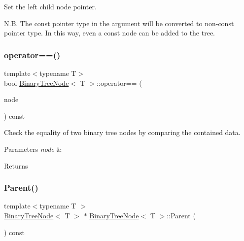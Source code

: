 Set the left child node pointer.

N.\+B. The const pointer type in the argument will be converted to non-\/const pointer type. In this way, even a const node can be added to the tree. \mbox{\label{classBinaryTreeNode_a0a362a295603c8dfffb45663e3c89507}} 
\subsubsection{\texorpdfstring{operator==()}{operator==()}}
{\footnotesize\ttfamily template$<$typename T$>$ \\
bool \hyperlink{classBinaryTreeNode}{Binary\+Tree\+Node}$<$ T $>$\+::operator== (\begin{DoxyParamCaption}\item[{const \hyperlink{classBinaryTreeNode}{Binary\+Tree\+Node}$<$ T $>$ \&}]{node }\end{DoxyParamCaption}) const}

Check the equality of two binary tree nodes by comparing the contained data. 
\begin{DoxyParams}{Parameters}
{\em node} & \\
\hline
\end{DoxyParams}
\begin{DoxyReturn}{Returns}

\end{DoxyReturn}
\mbox{\label{classBinaryTreeNode_a2eea9d71ae776d02b23bb9f3869f0f6d}} 
\subsubsection{\texorpdfstring{Parent()}{Parent()}\hspace{0.1cm}{\footnotesize\ttfamily [1/2]}}
{\footnotesize\ttfamily template$<$typename T $>$ \\
\hyperlink{classBinaryTreeNode}{Binary\+Tree\+Node}$<$ T $>$ $\ast$ \hyperlink{classBinaryTreeNode}{Binary\+Tree\+Node}$<$ T $>$\+::Parent (\begin{DoxyParamCaption}\item[{void}]{ }\end{DoxyParamCaption}) const}

